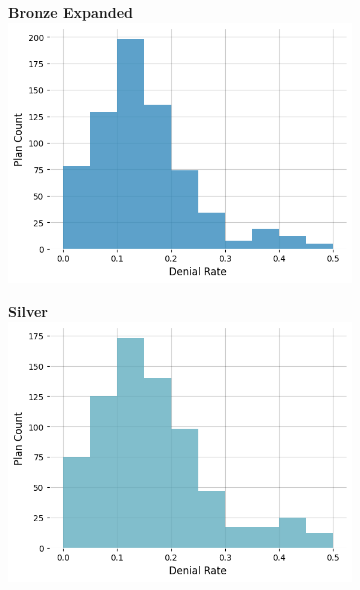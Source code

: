 \documentclass[12pt, a4paper,twoside]{report}
\theoremstyle{plain} %
\theoremstyle{definition} %
\theoremstyle{remark} %
\numberwithin{equation}{chapter}
\begin{document}
\begin{figure}
\begin{subfigure}[t]{0.49\textwidth}
				\end{subfigure}
				\hfill
				\vspace{1em}
				\begin{subfigure}[t]{0.49\textwidth}
					\centering
					\textbf{Bronze Expanded}
					\includegraphics[width=\textwidth]{images/cms_puf/Bronze Expanded_dist.png}
				\end{subfigure}
				\hfill
				\begin{subfigure}[t]{0.49\textwidth}
					\centering
					\textbf{Silver}
					\includegraphics[width=\textwidth]{images/cms_puf/Silver_dist.png}
				\end{subfigure}
				\hfill
				\vspace{1em}

\end{figure}
\end{document}
